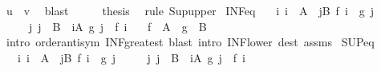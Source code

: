 \begin{isabellebody}
\ {\isachardoublequoteopen}u\ {\isasymle}\ v{\isachardoublequoteclose}\ \isamarkupfalse%
\ blast\isanewline
\ \ \isamarkupfalse%
\ \isamarkupfalse%
\ {\isacharquery}{\kern0pt}thesis\ \isamarkupfalse%
\ {\isacharparenleft}{\kern0pt}rule\ Sup{\isacharunderscore}{\kern0pt}upper{}{\isacharparenright}{\kern0pt}\isanewline
{}\isamarkupfalse%
%
\endisatagproof
{\isafoldproof}%
%
\isadelimproof
\isanewline
%
\endisadelimproof
\isanewline
{}\isamarkupfalse%
\ INF{\isacharunderscore}{\kern0pt}eq{\isacharcolon}{\kern0pt}\isanewline
\ \ \ {\isachardoublequoteopen}{\isasymAnd}i{\isachardot}{\kern0pt}\ i\ {\isasymin}\ A\ {\isasymLongrightarrow}\ {\isasymexists}j{\isasymin}B{\isachardot}{\kern0pt}\ f\ i\ {\isasymge}\ g\ j{\isachardoublequoteclose}\isanewline
\ \ \ \ \ {\isachardoublequoteopen}{\isasymAnd}j{\isachardot}{\kern0pt}\ j\ {\isasymin}\ B\ {\isasymLongrightarrow}\ {\isasymexists}i{\isasymin}A{\isachardot}{\kern0pt}\ g\ j\ {\isasymge}\ f\ i{\isachardoublequoteclose}\isanewline
\ \ \ {\isachardoublequoteopen}{\isasymSqinter}{\isacharparenleft}{\kern0pt}f\ {\isacharbackquote}{\kern0pt}\ A{\isacharparenright}{\kern0pt}\ {\isacharequal}{\kern0pt}\ {\isasymSqinter}{\isacharparenleft}{\kern0pt}g\ {\isacharbackquote}{\kern0pt}\ B{\isacharparenright}{\kern0pt}{\isachardoublequoteclose}\isanewline
%
\isadelimproof
\ \ %
\endisadelimproof
%
\isatagproof
{}\isamarkupfalse%
\ {\isacharparenleft}{\kern0pt}intro\ order{\isachardot}{\kern0pt}antisym\ INF{\isacharunderscore}{\kern0pt}greatest{\isacharparenright}{\kern0pt}\ {\isacharparenleft}{\kern0pt}blast\ intro{\isacharcolon}{\kern0pt}\ INF{\isacharunderscore}{\kern0pt}lower{}\ dest{\isacharcolon}{\kern0pt}\ assms{\isacharparenright}{\kern0pt}{\isacharplus}{\kern0pt}%
\endisatagproof
{\isafoldproof}%
%
\isadelimproof
\isanewline
%
\endisadelimproof
\isanewline
{}\isamarkupfalse%
\ SUP{\isacharunderscore}{\kern0pt}eq{\isacharcolon}{\kern0pt}\isanewline
\ \ \ {\isachardoublequoteopen}{\isasymAnd}i{\isachardot}{\kern0pt}\ i\ {\isasymin}\ A\ {\isasymLongrightarrow}\ {\isasymexists}j{\isasymin}B{\isachardot}{\kern0pt}\ f\ i\ {\isasymle}\ g\ j{\isachardoublequoteclose}\isanewline
\ \ \ \ \ {\isachardoublequoteopen}{\isasymAnd}j{\isachardot}{\kern0pt}\ j\ {\isasymin}\ B\ {\isasymLongrightarrow}\ {\isasymexists}i{\isasymin}A{\isachardot}{\kern0pt}\ g\ j\ {\isasymle}\ f\ i{\isachardoublequoteclose}\isanewline

\end{isabellebody}
